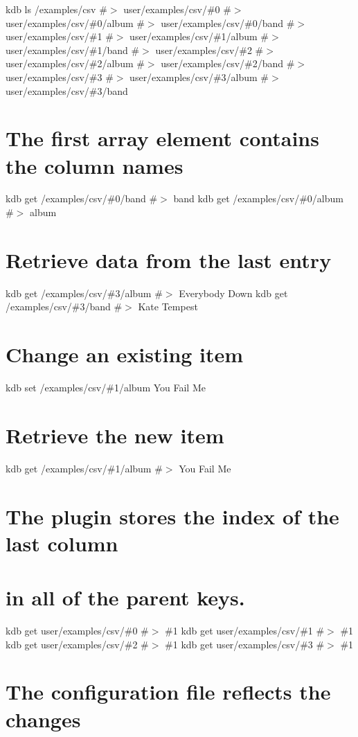 kdb ls /examples/csv \#$>$ user/examples/csv/\#0 \#$>$ user/examples/csv/\#0/album \#$>$ user/examples/csv/\#0/band \#$>$ user/examples/csv/\#1 \#$>$ user/examples/csv/\#1/album \#$>$ user/examples/csv/\#1/band \#$>$ user/examples/csv/\#2 \#$>$ user/examples/csv/\#2/album \#$>$ user/examples/csv/\#2/band \#$>$ user/examples/csv/\#3 \#$>$ user/examples/csv/\#3/album \#$>$ user/examples/csv/\#3/band

\section*{The first array element contains the column names}

kdb get /examples/csv/\#0/band \#$>$ band kdb get /examples/csv/\#0/album \#$>$ album

\section*{Retrieve data from the last entry}

kdb get /examples/csv/\#3/album \#$>$ Everybody Down kdb get /examples/csv/\#3/band \#$>$ Kate Tempest

\section*{Change an existing item}

kdb set /examples/csv/\#1/album \textquotesingle{}You Fail Me\textquotesingle{} \section*{Retrieve the new item}

kdb get /examples/csv/\#1/album \#$>$ You Fail Me

\section*{The plugin stores the index of the last column}

\section*{in all of the parent keys.}

kdb get user/examples/csv/\#0 \#$>$ \#1 kdb get user/examples/csv/\#1 \#$>$ \#1 kdb get user/examples/csv/\#2 \#$>$ \#1 kdb get user/examples/csv/\#3 \#$>$ \#1

\section*{The configuration file reflects the changes}


